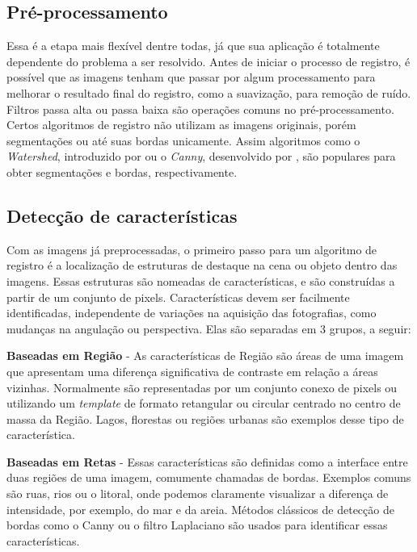 \subsection{Pré-processamento}
    Essa é a etapa mais flexível dentre todas, já que sua aplicação é totalmente dependente do problema a ser resolvido. 
Antes de iniciar o processo de registro, é possível que as imagens tenham que passar por algum processamento para 
melhorar o resultado final do registro, como a suavização, para remoção de ruído. Filtros passa alta ou 
passa baixa são operações comuns no pré-processamento. Certos algoritmos de registro não utilizam as imagens
originais, porém segmentações ou até suas bordas unicamente. Assim algoritmos como o \textit{Watershed}, introduzido por 
\cite{vincent1991watersheds} ou o \textit{Canny}, desenvolvido por \cite{canny1986computational}, são populares
para obter segmentações e bordas, respectivamente.

\subsection{Detecção de características}
\label{sec:dec_corr_carac}

    Com as imagens já preprocessadas, o primeiro passo para um algoritmo de registro é a localização de estruturas de 
destaque na cena ou objeto dentro das imagens. Essas estruturas são nomeadas de características, e são construídas a 
partir de um conjunto de pixels. Características devem ser facilmente identificadas, independente de variações na 
aquisição das fotografias, como mudanças na angulação ou perspectiva. Elas são separadas em 3 grupos, a seguir:

\textbf{Baseadas em Região} - As características de Região são áreas de uma imagem que apresentam uma diferença
significativa de contraste em relação a áreas vizinhas. Normalmente são representadas por um
conjunto conexo de pixels ou utilizando um \textit{template} de formato retangular ou circular centrado no centro de 
massa da Região. Lagos, florestas ou regiões urbanas são exemplos desse tipo de 
característica.

\textbf{Baseadas em Retas} - Essas características são definidas como a interface entre duas regiões de uma 
imagem, comumente chamadas de bordas. Exemplos comuns são ruas, rios ou o litoral, onde 
podemos claramente visualizar a diferença de intensidade, por exemplo, do mar e da areia. Métodos clássicos de detecção 
de bordas como o Canny ou o filtro Laplaciano são usados para identificar essas características.

